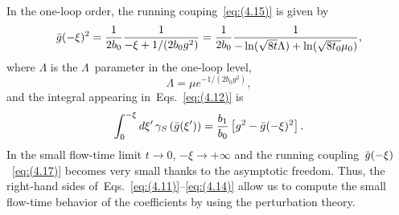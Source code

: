 In the one-loop order, the running couping~\eqref{eq:(4.15)} is given by
\begin{equation}
   \Bar{g}(-\xi)^2=\frac{1}{2b_0}\frac{1}{-\xi+1/(2b_0g^2)}
   =\frac{1}{2b_0}\frac{1}{-\ln(\sqrt{8t}\Lambda)+\ln(\sqrt{8t_0}\mu_0)},
\label{eq:(4.17)}
\end{equation}
where $\Lambda$ is the $\Lambda$~parameter in the one-loop level,
\begin{equation}
   \Lambda=\mu e^{-1/(2b_0g^2)},
\label{eq:(4.18)}
\end{equation}
and the integral appearing in~Eqs.~\eqref{eq:(4.12)} is
\begin{equation}
   \int_0^{-\xi}d\xi'\,
   \gamma_S\left(\Bar{g}(\xi')\right)
   =\frac{b_1}{b_0}
   \left[
   g^2-\Bar{g}(-\xi)^2
   \right].
\label{eq:(4.19)}
\end{equation}
In the small flow-time limit $t\to0$, $-\xi\to+\infty$ and the running
coupling~$\Bar{g}(-\xi)$~\eqref{eq:(4.17)} becomes very small thanks to the
asymptotic freedom. Thus, the right-hand sides
of~Eqs.~\eqref{eq:(4.11)}--\eqref{eq:(4.14)} allow us to compute the small
flow-time behavior of the coefficients by using the perturbation theory.

